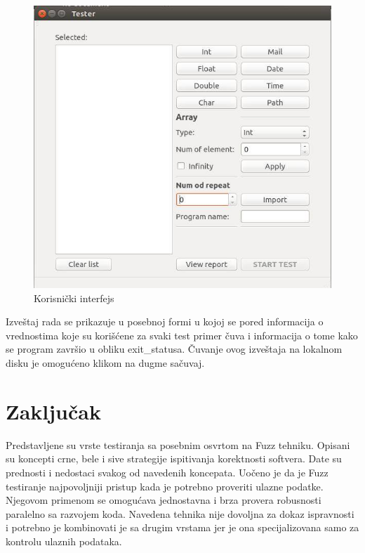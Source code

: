 \documentclass[a4paper]{article}
\begin{document}
{\begin{figure}[h!]
\begin{center}
\includegraphics[scale=0.5]{korisnicki_interfejs.jpg}
\end{center}
\caption{Korisnički interfejs}
\label{fig:interfejs}
\end{figure}

Izveštaj rada se prikazuje u posebnoj formi u kojoj se pored informacija o vrednostima koje su korišćene za svaki test primer čuva i informacija o tome kako se program završio u obliku exit\_statusa. Čuvanje ovog izveštaja na lokalnom disku je omogućeno klikom na dugme sačuvaj.

\section{Zaključak}
\label{sec:zakljucak}
Predstavljene su vrste testiranja sa posebnim osvrtom na Fuzz tehniku. Opisani su koncepti crne, bele i sive strategije ispitivanja korektnosti softvera. Date su prednosti i nedostaci svakog od navedenih koncepata. Uočeno je da je Fuzz testiranje najpovoljniji pristup kada je potrebno proveriti ulazne podatke. Njegovom primenom se omogućava jednostavna i brza provera robusnosti paralelno sa razvojem koda. Navedena tehnika nije dovoljna za dokaz ispravnosti i potrebno je kombinovati je sa drugim vrstama jer je ona specijalizovana samo za kontrolu ulaznih podataka. \\

}
\end{document}
